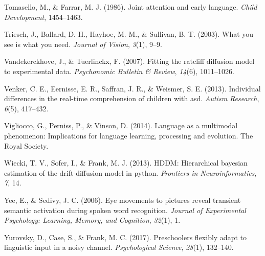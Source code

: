 \documentclass[,man,floatsintext]{apa6}
\begin{document}
\hypertarget{ref-tomasello1986joint}{}
Tomasello, M., \& Farrar, M. J. (1986). Joint attention and early
language. \emph{Child Development}, 1454--1463.

\hypertarget{ref-triesch2003you}{}
Triesch, J., Ballard, D. H., Hayhoe, M. M., \& Sullivan, B. T. (2003).
What you see is what you need. \emph{Journal of Vision}, \emph{3}(1),
9--9.

\hypertarget{ref-vandekerckhove2007fitting}{}
Vandekerckhove, J., \& Tuerlinckx, F. (2007). Fitting the ratcliff
diffusion model to experimental data. \emph{Psychonomic Bulletin \&
Review}, \emph{14}(6), 1011--1026.

\hypertarget{ref-venker2013individual}{}
Venker, C. E., Eernisse, E. R., Saffran, J. R., \& Weismer, S. E.
(2013). Individual differences in the real-time comprehension of
children with asd. \emph{Autism Research}, \emph{6}(5), 417--432.

\hypertarget{ref-vigliocco2014language}{}
Vigliocco, G., Perniss, P., \& Vinson, D. (2014). Language as a
multimodal phenomenon: Implications for language learning, processing
and evolution. The Royal Society.

\hypertarget{ref-wiecki2013hddm}{}
Wiecki, T. V., Sofer, I., \& Frank, M. J. (2013). HDDM: Hierarchical
bayesian estimation of the drift-diffusion model in python.
\emph{Frontiers in Neuroinformatics}, \emph{7}, 14.

\hypertarget{ref-yee2006eye}{}
Yee, E., \& Sedivy, J. C. (2006). Eye movements to pictures reveal
transient semantic activation during spoken word recognition.
\emph{Journal of Experimental Psychology: Learning, Memory, and
Cognition}, \emph{32}(1), 1.

\hypertarget{ref-yurovsky2017preschoolers}{}
Yurovsky, D., Case, S., \& Frank, M. C. (2017). Preschoolers flexibly
adapt to linguistic input in a noisy channel. \emph{Psychological
Science}, \emph{28}(1), 132--140.

\clearpage
\makeatletter
\efloat@restorefloats
\makeatother
\end{document}
